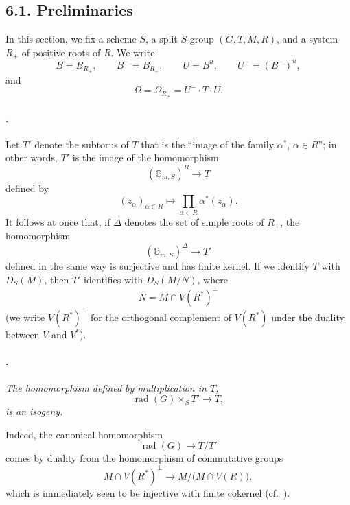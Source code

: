 \subsection*{6.1. Preliminaries}

In this section, we fix a scheme \(S\), a split \(S\)-group
\((G,T,M,R)\), and a system \(R_+\) of positive roots of \(R\).
We write
\[
  B=B_{R_+},\qquad B^-=B_{R_-},\qquad
  U=B^u,\qquad U^-=(B^-)^u,
\]
and
\[
  \Omega=\Omega_{R_+}=U^-\cdot T\cdot U.
\]

\paragraph{.}
Let \(T'\) denote the subtorus of \(T\) that is the ``image of the
family \(\alpha^*\), \(\alpha\in R\)''; in other words, \(T'\) is
the image of the homomorphism
\[
  (\mathbb G_{m,S})^R\longrightarrow T
\]
defined by
\[
  (z_\alpha)_{\alpha\in R}
  \longmapsto
  \prod_{\alpha\in R}\alpha^*(z_\alpha).
\]
It follows at once that, if \(\Delta\) denotes the set of simple
roots of \(R_+\), the homomorphism
\[
  (\mathbb G_{m,S})^\Delta\longrightarrow T'
\]
defined in the same way is surjective and has finite kernel. If
we identify \(T\) with \(D_S(M)\), then \(T'\) identifies with
\(D_S(M/N)\), where
\[
  N=M\cap V(R^*)^\perp
\]
\textup{(we write \(V(R^*)^\perp\) for the orthogonal complement
of \(V(R^*)\) under the duality between \(V\) and \(V^*\))}.

\paragraph{.}
{\itshape The homomorphism defined by multiplication in \(T\),
\[
  \operatorname{rad}(G)\times_S T'\longrightarrow T,
\]
is an isogeny.}

Indeed, the canonical homomorphism
\[
  \operatorname{rad}(G)\longrightarrow T/T'
\]
comes by duality from the homomorphism of commutative groups
\[
  M\cap V(R^*)^\perp
  \longrightarrow
  M\big/\bigl(M\cap V(R)\bigr),
\]
which is immediately seen to be injective with finite cokernel
\textup{(cf.\ )}.

